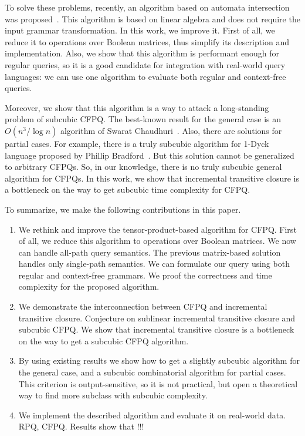 To solve these problems, recently, an algorithm based on automata intersection was proposed~\cite{10.1007/978-3-030-54832-2_6}.
This algorithm is based on linear algebra and does not require the input grammar transformation.
In this work, we improve it.
First of all, we reduce it to operations over Boolean matrices, thus simplify its description and implementation.
Also, we show that this algorithm is performant enough for regular queries, so it is a good candidate for integration with real-world query languages: we can use one algorithm to evaluate both regular and context-free queries. 

Moreover, we show that this algorithm is a way to attack a long-standing problem of subcubic CFPQ. 
The best-known result for the general case is an $O(n^3/\log{n})$ algorithm of Swarat Chaudhuri~\cite{10.1145/1328438.1328460}. 
Also, there are solutions for partial cases. 
For example, there is a truly subcubic algorithm for 1-Dyck language proposed by Phillip Bradford~\cite{8249039}.
But this solution cannot be generalized to arbitrary CFPQs. 
So, in our knowledge, there is no truly subcubic general algorithm for CFPQs. 
In this work, we show that incremental transitive closure is a bottleneck on the way to get subcubic time complexity for CFPQ.

To summarize, we make the following contributions in this paper.
\begin{enumerate}
	\item We rethink and improve the tensor-product-based algorithm for CFPQ. First of all, we reduce this algorithm to operations over Boolean matrices. We now can handle all-path query semantics. The previous matrix-based solution handles only single-path semantics. We can formulate our query using both regular and context-free grammars. We proof the correctness and time complexity for the proposed algorithm.
	\item We demonstrate the interconnection between CFPQ and incremental transitive closure. Conjecture on sublinear incremental transitive closure and subcubic CFPQ. We show that incremental transitive closure is a bottleneck on the way to get a subcubic CFPQ algorithm.
	\item By using existing results we show how to get a slightly subcubic algorithm for the general case, and a subcubic combinatorial algorithm for partial cases. This criterion is output-sensitive, so it is not practical, but open a theoretical way to find more subclass with subcubic complexity.
	\item We implement the described algorithm and evaluate it on real-world data. RPQ, CFPQ. Results show that !!!
\end{enumerate}